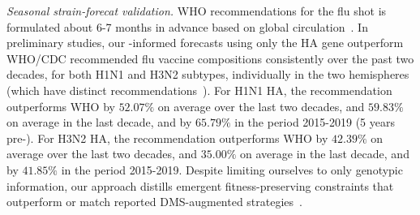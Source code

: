 \documentclass[onecolumn, compsoc,12pt]{IEEEtran}
\begin{document}
\textit{Seasonal strain-forecat validation.} WHO  recommendations for the flu shot  is  formulated about 6-7 months in advance based on global circulation~\cite{agor2018models}. 
In  preliminary studies, our \enet-informed forecasts using only the HA gene outperform  WHO/CDC recommended flu vaccine compositions consistently over the past two decades, for both H1N1 and H3N2 subtypes, individually in the two hemispheres (which have distinct recommendations~\cite{boni2008vaccination}). For H1N1 HA, the \enet  recommendation outperforms  WHO  by $52.07\%$ on average over the last two decades, and $59.83\%$ on average in the last decade, and by $65.79\%$ in the period 2015-2019 (5 years pre-\cov). For H3N2 HA, the \enet  recommendation outperforms  WHO  by $42.39\%$ on average over the last two decades, and $35.00\%$ on average in the last decade, and by $41.85\%$ in the period 2015-2019. Despite limiting ourselves to only genotypic  information, our approach  distills  emergent  fitness-preserving constraints   that outperform or match reported DMS-augmented strategies~\cite{huddleston2020integrating,REF}.
\end{document}
